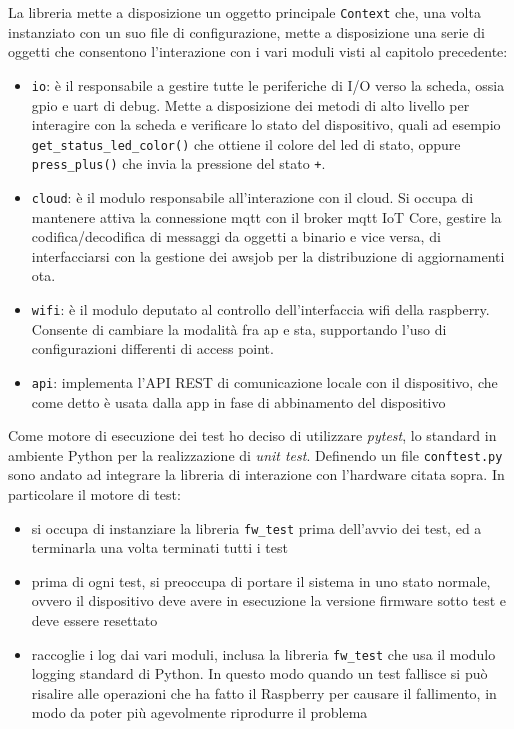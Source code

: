 \documentclass[12pt,a4paper,twoside,titlepage]{book}
\begin{document}
La libreria mette a disposizione un oggetto principale \texttt{Context} che, una
volta instanziato con un suo file di configurazione, mette a disposizione una serie
di oggetti che consentono l'interazione con i vari moduli visti al capitolo precedente:

\begin{itemize}
    \item \texttt{io}: è il responsabile a gestire tutte le periferiche di I/O
        verso la scheda, ossia \Gls{gpio} e \Gls{uart} di debug. Mette a disposizione dei metodi di
        alto livello per interagire con la scheda e verificare lo stato del dispositivo,
        quali ad esempio \texttt{get\_status\_led\_color()} che ottiene il colore del
        \acrshort{led} di stato, oppure \texttt{press\_plus()} che invia la pressione del stato \texttt{+}.
    \item \texttt{cloud}: è il modulo responsabile all'interazione con il cloud. Si
        occupa di mantenere attiva la connessione \Gls{mqtt} con il broker \Gls{mqtt} IoT Core,
        gestire la codifica/decodifica di messaggi da oggetti a binario e vice versa,
        di interfacciarsi con la gestione dei \Gls{awsjob} per la distribuzione di aggiornamenti
        \acrshort{ota}.
    \item \texttt{wifi}: è il modulo deputato al controllo dell'interfaccia \Gls{wifi}
        della raspberry. Consente di cambiare la modalità fra \acrshort{ap} e \acrshort{sta},
        supportando l'uso di configurazioni differenti di access point.
    \item \texttt{api}: implementa l'API REST di comunicazione locale con il dispositivo,
        che come detto è usata dalla app in fase di abbinamento del dispositivo
\end{itemize}

Come motore di esecuzione dei test ho deciso di utilizzare \textit{pytest}, lo standard 
in ambiente Python per la realizzazione di \textit{unit test}. Definendo un file \texttt{conftest.py}
sono andato ad integrare la libreria di interazione con l'hardware citata sopra. In particolare il motore di test:

\begin{itemize}
    \item si occupa di instanziare la libreria \texttt{fw\_test} prima dell'avvio
        dei test, ed a terminarla una volta terminati tutti i test
    \item prima di ogni test, si preoccupa di portare il sistema in uno stato normale,
        ovvero il dispositivo deve avere in esecuzione la versione \gls{firmware} sotto test
        e deve essere resettato
    \item raccoglie i log dai vari moduli, inclusa la libreria \texttt{fw\_test} che
        usa il modulo logging standard di Python. In questo modo quando un test
        fallisce si può risalire alle operazioni che ha fatto il Raspberry per causare
        il fallimento, in modo da poter più agevolmente riprodurre il problema
\end{itemize}
\end{document}
